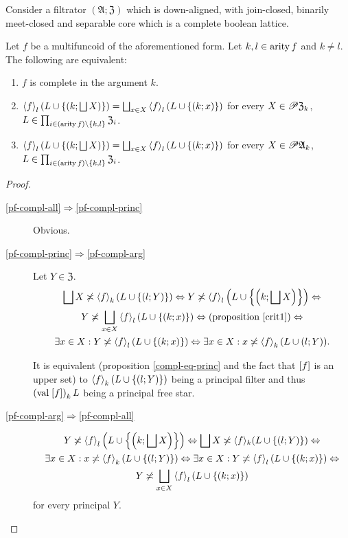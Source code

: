 \begin{thm}
\label{mfunc-compl-k}Consider a filtrator $(\mathfrak{A};\mathfrak{Z})$
which is down-aligned, with join-closed, binarily meet-closed and
separable core which is a complete boolean lattice.

Let $f$ be a multifuncoid of the aforementioned form. Let $k,l\in\operatorname{arity} f$
and $k\neq l$. The following are equivalent: 
\begin{enumerate}
\item \label{pf-compl-arg}$f$ is complete in the argument $k$.
\item \label{pf-compl-princ}$\left\langle f\right\rangle_{l}\left(L\cup\left\{ \left(k;\bigsqcup X\right)\right\} \right)=\bigsqcup_{x\in X}\left\langle f\right\rangle_{l}(L\cup\{(k;x)\})$
for every $X\in\mathscr{P}\mathfrak{Z}_{k}$, $L\in\prod_{i\in(\operatorname{arity} f)\setminus\{k,l\}}\mathfrak{Z}_{i}$.
\item \label{pf-compl-all}$\left\langle f\right\rangle_{l}\left(L\cup\left\{ \left(k;\bigsqcup X\right)\right\} \right)=\bigsqcup_{x\in X}\left\langle f\right\rangle_{l}(L\cup\{(k;x)\})$
for every $X\in\mathscr{P}\mathfrak{A}_{k}$, $L\in\prod_{i\in(\operatorname{arity} f)\setminus\{k,l\}}\mathfrak{Z}_{i}$.
\end{enumerate}
\end{thm}
\begin{proof}
~
\begin{description}
\item [{\ref{pf-compl-all}$\Rightarrow$\ref{pf-compl-princ}}] Obvious.
\item [{\ref{pf-compl-princ}$\Rightarrow$\ref{pf-compl-arg}}] Let $Y\in\mathfrak{Z}$.
\begin{multline*}
\bigsqcup X\not\asymp\left\langle f\right\rangle_{k}(L\cup\{(l;Y)\})\Leftrightarrow Y\not\asymp\left\langle f\right\rangle_{l}\left(L\cup\left\{ \left(k;\bigsqcup X\right)\right\} \right)\Leftrightarrow\\
Y\not\asymp\bigsqcup_{x\in X}\left\langle f\right\rangle_{l}(L\cup\{(k;x)\})\Leftrightarrow\text{(proposition \ref{crit1})}\Leftrightarrow\\
\exists x\in X:Y\not\asymp\left\langle f\right\rangle_{l}(L\cup\{(k;x)\})\Leftrightarrow\exists x\in X:x\not\asymp\left\langle f\right\rangle_{k}(L\cup(l;Y)).
\end{multline*}



It is equivalent (proposition \ref{compl-eq-princ} and the fact that
$\mathrel{\left[f\right]}$ is an upper set) to $\left\langle f\right\rangle_{k}(L\cup\{(l;Y)\})$
being a principal filter and thus $\left(\operatorname{val}\mathrel{\left[f\right]}\right)_{k}L$
being a principal free star.

\item [{\ref{pf-compl-arg}$\Rightarrow$\ref{pf-compl-all}}] 
\begin{multline*}
Y\not\asymp\left\langle f\right\rangle_{l}\left(L\cup\left\{ \left(k;\bigsqcup X\right)\right\} \right)\Leftrightarrow\bigsqcup X\not\asymp\langle f\rangle_{k}(L\cup\{(l;Y)\})\Leftrightarrow\\
\exists x\in X:x\not\asymp\left\langle f\right\rangle_{k}(L\cup\{(l;Y)\})\Leftrightarrow\exists x\in X:Y\not\asymp\left\langle f\right\rangle_{l}(L\cup\{(k;x)\})\Leftrightarrow\\
Y\not\asymp\bigsqcup_{x\in X}\left\langle f\right\rangle_{l}(L\cup\{(k;x)\})
\end{multline*}
for every principal $Y$.
\end{description}
\end{proof}

